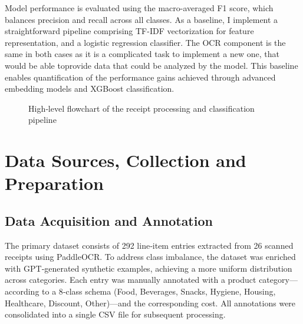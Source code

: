 \documentclass{SGGW-thesis-EN}
\begin{document}
Model performance is evaluated using the macro-averaged F1 score, which balances precision and recall across all classes. 
As a baseline, I implement a straightforward pipeline comprising TF-IDF vectorization for feature representation, 
and a logistic regression classifier. The OCR component is the same in both cases as it is a complicated task to implement a new one, 
that would be able toprovide data that could be analyzed by the model.
This baseline enables quantification of the performance gains achieved through advanced embedding models and XGBoost classification.

\begin{figure}[h!]
  \centering
  \caption{High‐level flowchart of the receipt processing and classification pipeline}
  \label{fig:pipeline_flowchart_vertical}
\end{figure}


\section{Data Sources, Collection and Preparation}

\subsection{Data Acquisition and Annotation}
The primary dataset consists of 292 line‐item entries extracted from 26 scanned receipts using PaddleOCR. To address class imbalance,
the dataset was enriched with GPT‐generated synthetic examples, achieving a more uniform distribution across categories. Each entry was manually annotated
with a product category— according to a  8‐class schema (Food, Beverages, Snacks, Hygiene,
Housing, Healthcare, Discount, Other)—and the corresponding cost. All annotations were consolidated into a single CSV file for subsequent processing.
\end{document}
